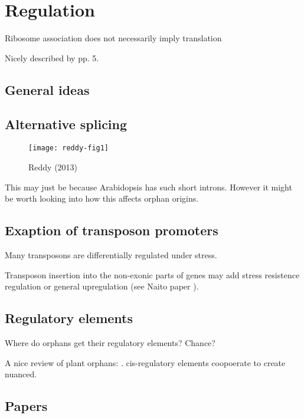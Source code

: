 \section{Regulation}
  Ribosome association does not necessarily imply translation
  \cite{guttman_ribosome_2013}

  Nicely described by \cite{tautz_evolutionary_2011} pp. 5.

  \subsection{General ideas}

  \subsection{Alternative splicing}

      \begin{figure}[!hbpt]
        \centering
        \texttt{[image: reddy-fig1]}
        \caption{Reddy (2013) \cite{reddy_complexity_2013}}
      \end{figure}

      This may just be because Arabidopsis has such short introns. However it
      might be worth looking into how this affects orphan origins.

  \subsection{Exaption of transposon promoters}

    Many transposons are differentially regulated under stress.

    Transposon insertion into the non-exonic parts of genes may add stress
    resistence regulation or general upregulation (see Naito paper \cite{naito_unexpected_2009}).


  \subsection{Regulatory elements}

    Where do orphans get their regulatory elements? Chance?

    A nice review of plant orphans: \cite{priest_cis-regulatory_2009}.
    cis-regulatory elements coopoerate to create nuanced.

  \subsection{Papers}

